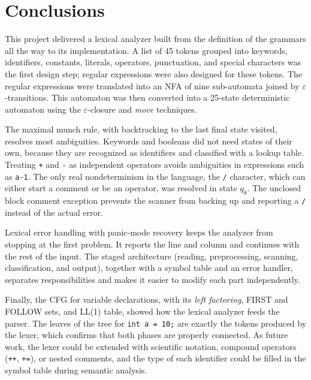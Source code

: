\documentclass[12pt,letterpaper]{article}
\newcommand{\cd}[1]{\texttt{#1}}                       %
\begin{document}
\section{Conclusions}
This project delivered a lexical analyzer built from the definition of the grammars all the way to its implementation. A list of 45 tokens grouped into keywords, identifiers, constants, literals, operators, punctuation, and special characters was the first design step; regular expressions were also designed for these tokens. The regular expressions were translated into an NFA of nine sub-automata joined by $\varepsilon$-transitions. This automaton was then converted into a 25-state deterministic automaton using the $\varepsilon$-closure and \textit{move} techniques.

The maximal munch rule, with backtracking to the last final state visited, resolves most ambiguities. Keywords and booleans did not need states of their own, because they are recognized as identifiers and classified with a lookup table. Treating \cd{+} and \cd{-} as independent operators avoids ambiguities in expressions such as \cd{a-1}. The only real nondeterminism in the language, the \cd{/} character, which can either start a comment or be an operator, was resolved in state $q_8$. The unclosed block comment exception prevents the scanner from backing up and reporting a \cd{/} instead of the actual error.

Lexical error handling with panic-mode recovery keeps the analyzer from stopping at the first problem. It reports the line and column and continues with the rest of the input. The staged architecture (reading, preprocessing, scanning, classification, and output), together with a symbol table and an error handler, separates responsibilities and makes it easier to modify each part independently.

Finally, the CFG for variable declarations, with its \textit{left factoring}, FIRST and FOLLOW sets, and LL(1) table, showed how the lexical analyzer feeds the parser. The leaves of the tree for \cd{int a = 10;} are exactly the tokens produced by the lexer, which confirms that both phases are properly connected. As future work, the lexer could be extended with scientific notation, compound operators (\cd{++}, \cd{+=}), or nested comments, and the type of each identifier could be filled in the symbol table during semantic analysis.
\end{document}
